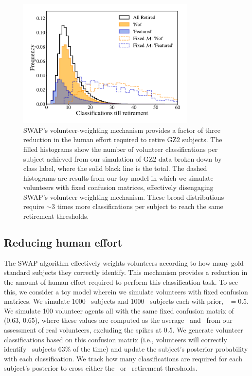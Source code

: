 \begin{figure}[t!] 
\centering
\includegraphics[width=3.5in]{Figures/human_machine/f4.pdf}
\caption[SWAP volunteer weighting mechanism reduces human effort for classification]{SWAP's volunteer-weighting mechanism provides a factor of three reduction in the human effort required to retire GZ2 subjects. The filled histograms show the number of volunteer classifications per subject achieved from our simulation of GZ2 data broken down by class label, where the solid black line is the total. The dashed histograms are results from our toy model in which we simulate volunteers with fixed confusion matrices, effectively disengaging SWAP's volunteer-weighting mechanism. These broad distributions require $\sim$3 times more classifications per subject to reach the same retirement thresholds.} 
\label{fig: swap vote distributions}
\end{figure}

\subsection{Reducing human effort}

The SWAP algorithm effectively weights volunteers according to how many gold 
standard subjects they correctly identify. This mechanism provides a reduction 
in the amount of human effort required to perform this classification task. 
To see this, we consider a toy model wherein we simulate volunteers with fixed 
confusion matrices. We simulate 1000 \feat~subjects and 1000 \notfeat~subjects 
each with prior, \p~$ = 0.5$. We simulate 100 volunteer agents all with the same 
fixed confusion matrix of (0.63, 0.65), where these values are computed as the 
average \Pf~and \Pn~from our assessment of real volunteers, excluding the spikes at 0.5. 
We generate volunteer classifications based on this confusion matrix 
(i.e., volunteers will correctly identify \feat~subjects 63\% of the time) 
and update the subject's posterior probability with each classification. 
We track how many classifications are required for each subject's posterior to 
cross either the \feat~or \notfeat~retirement thresholds. 

